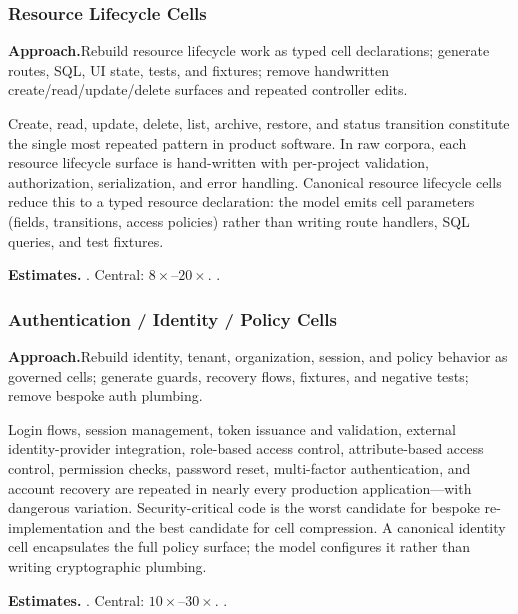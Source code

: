 \subsubsection{Resource Lifecycle Cells}
\label{ssec:crud-cells}

\smallskip\noindent
\textbf{Approach.}\quad Rebuild resource lifecycle work as typed cell declarations; generate routes, SQL, UI state, tests, and fixtures; remove handwritten create/read/update/delete surfaces and repeated controller edits.

Create, read, update, delete, list, archive, restore, and status
transition constitute the single most repeated pattern in product
software.  In raw corpora, each resource lifecycle surface is hand-written with
per-project validation, authorization, serialization, and error handling.
Canonical resource lifecycle cells reduce this to a typed resource declaration: the
model emits cell parameters (fields, transitions, access policies)
rather than writing route handlers, SQL queries, and test fixtures.

\smallskip\noindent
\textbf{Estimates.}\quad
{}.\quad
Central: $8\times$--$20\times$.\quad
{}.

\subsubsection{Authentication / Identity / Policy Cells}
\label{ssec:auth-cells}

\smallskip\noindent
\textbf{Approach.}\quad Rebuild identity, tenant, organization, session, and policy behavior as governed cells; generate guards, recovery flows, fixtures, and negative tests; remove bespoke auth plumbing.

Login flows, session management, token issuance and validation, external
identity-provider integration, role-based access control,
attribute-based access control, permission checks, password reset,
multi-factor authentication, and account recovery are repeated in nearly
every production application---with dangerous variation.  Security-critical
code is the worst candidate for bespoke re-implementation and the best
candidate for cell compression.  A canonical identity cell encapsulates
the full policy surface; the model configures it rather than writing
cryptographic plumbing.

\smallskip\noindent
\textbf{Estimates.}\quad
{}.\quad
Central: $10\times$--$30\times$.\quad
{}.

